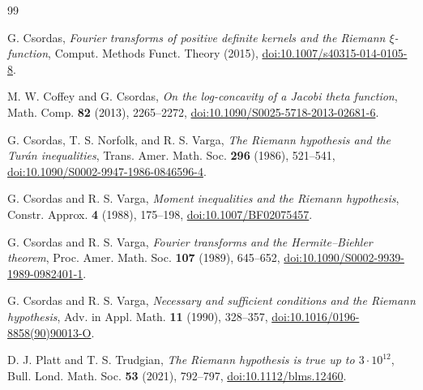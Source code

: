 \documentclass[11pt]{amsart}
\theoremstyle{remark}
\begin{document}
\begin{thebibliography}{99}
\small

G. Csordas,
\emph{Fourier transforms of positive definite kernels and the Riemann
$\xi$-function},
Comput. Methods Funct. Theory (2015),
\href{https://doi.org/10.1007/s40315-014-0105-8}{doi:10.1007/s40315-014-0105-8}.

M. W. Coffey and G. Csordas,
\emph{On the log-concavity of a Jacobi theta function},
Math. Comp. \textbf{82} (2013), 2265--2272,
\href{https://doi.org/10.1090/S0025-5718-2013-02681-6}{doi:10.1090/S0025-5718-2013-02681-6}.

G. Csordas, T. S. Norfolk, and R. S. Varga,
\emph{The Riemann hypothesis and the Tur\'an inequalities},
Trans. Amer. Math. Soc. \textbf{296} (1986), 521--541,
\href{https://doi.org/10.1090/S0002-9947-1986-0846596-4}{doi:10.1090/S0002-9947-1986-0846596-4}.

G. Csordas and R. S. Varga,
\emph{Moment inequalities and the Riemann hypothesis},
Constr. Approx. \textbf{4} (1988), 175--198,
\href{https://doi.org/10.1007/BF02075457}{doi:10.1007/BF02075457}.

G. Csordas and R. S. Varga,
\emph{Fourier transforms and the Hermite--Biehler theorem},
Proc. Amer. Math. Soc. \textbf{107} (1989), 645--652,
\href{https://doi.org/10.1090/S0002-9939-1989-0982401-1}{doi:10.1090/S0002-9939-1989-0982401-1}.

G. Csordas and R. S. Varga,
\emph{Necessary and sufficient conditions and the Riemann hypothesis},
Adv. in Appl. Math. \textbf{11} (1990), 328--357,
\href{https://doi.org/10.1016/0196-8858(90)90013-O}{doi:10.1016/0196-8858(90)90013-O}.

D. J. Platt and T. S. Trudgian,
\emph{The Riemann hypothesis is true up to $3\cdot10^{12}$},
Bull. Lond. Math. Soc. \textbf{53} (2021), 792--797,
\href{https://doi.org/10.1112/blms.12460}{doi:10.1112/blms.12460}.

\end{thebibliography}
\end{document}
